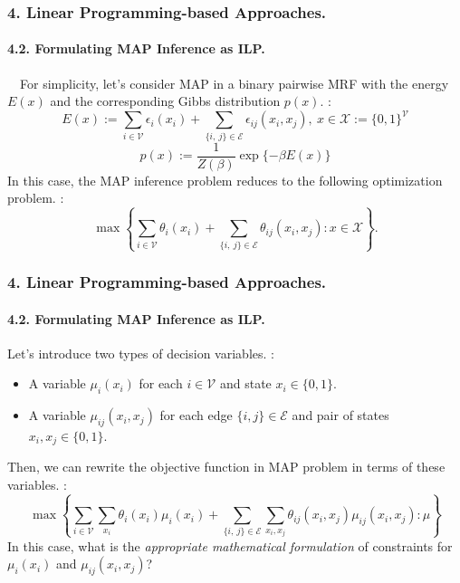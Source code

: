\documentclass[11pt]{beamer}
\newtheorem*{pf of lemma}{\it Proof of the \normalfont \bf Lemma}
\newtheorem*{pf of claim}{\it Proof of the \normalfont \sf Claim}
\begin{document}
\begin{frame}
\frametitle{4. Linear Programming-based Approaches.}
\framesubtitle{4.2. Formulating MAP Inference as ILP.}

\ \ \indent For simplicity, let's consider MAP in a binary pairwise MRF with the energy $E(x)$ and the corresponding Gibbs distribution $p(x)$. :
$$E(x) :=\sum_{i \in \mathcal{V}} \epsilon_{i}(x_i) + \sum_{\{i,\ j\} \in \mathcal{E}} \epsilon_{ij}(x_i, x_j), \ x \in \mathcal{X} := \{0,1\}^{\mathcal{V}}$$
$$p(x) := \frac{1}{Z(\beta)} \exp\{- \beta E(x)\}$$
In this case, the MAP inference problem reduces to the following optimization problem. :
$$\max \left\{ \sum_{i \in \mathcal{V}} \theta_{i}(x_i) + \sum_{\{i,\ j\} \in \mathcal{E}} \theta_{ij}(x_i, x_j) : x \in \mathcal{X} \right\}.$$

\end{frame}

\begin{frame}
\frametitle{4. Linear Programming-based Approaches.}
\framesubtitle{4.2. Formulating MAP Inference as ILP.}

Let's introduce two types of decision variables. : \\
\begin{itemize}
\item A variable $\mu_{i}(x_i)$ for each $i \in \mathcal{V}$ and state $x_i \in \{0,1\}$. \\
\item A variable $\mu_{ij}(x_i,x_j)$ for each edge $\{i, j\} \in \mathcal{E}$ and pair of states $x_i, x_j \in \{0,1\}$. 
\end{itemize}
Then, we can rewrite the objective function in MAP problem in terms of these variables. : 
$$\max \left\{ \sum_{i \in \mathcal{V}} \sum_{x_i} \theta_i (x_i) \mu_i(x_i) + \sum_{ \{i,\ j \} \in \mathcal{E}} \sum_{x_i, x_j} \theta_{ij}(x_i, x_j) \mu_{ij}(x_i, x_j) : \mu \right\}$$
In this case, what is the \textit{appropriate mathematical formulation} of constraints for $\mu_i(x_i)$ and $\mu_{ij}(x_i, x_j)$?
\end{frame}
\end{document}
